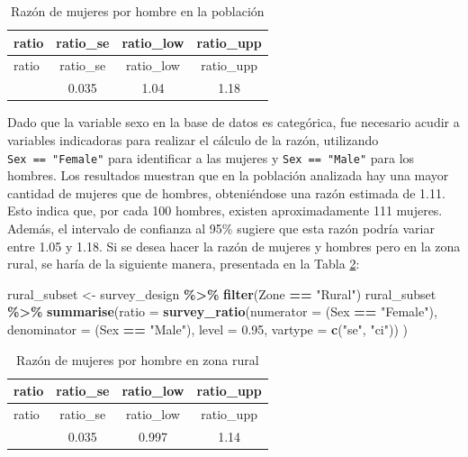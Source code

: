 \documentclass[
  spanish,
  12pt,
]{book}
\newenvironment{Shaded}{\begin{snugshade}}{\end{snugshade}}
\newcommand{\AttributeTok}[1]{\textcolor[rgb]{0.13,0.29,0.53}{#1}}
\newcommand{\FloatTok}[1]{\textcolor[rgb]{0.00,0.00,0.81}{#1}}
\newcommand{\FunctionTok}[1]{\textcolor[rgb]{0.13,0.29,0.53}{\textbf{#1}}}
\newcommand{\NormalTok}[1]{#1}
\newcommand{\OtherTok}[1]{\textcolor[rgb]{0.56,0.35,0.01}{#1}}
\newcommand{\SpecialCharTok}[1]{\textcolor[rgb]{0.81,0.36,0.00}{\textbf{#1}}}
\newcommand{\StringTok}[1]{\textcolor[rgb]{0.31,0.60,0.02}{#1}}
\begin{document}
\begin{longtable}[]{@{}lccc@{}}
\caption{\label{tab:tab-razon-sexo}Razón de mujeres por hombre en la población}\tabularnewline
\toprule\noalign{}
ratio & ratio\_se & ratio\_low & ratio\_upp \\
\midrule\noalign{}
\endfirsthead
\toprule\noalign{}
ratio & ratio\_se & ratio\_low & ratio\_upp \\
\midrule\noalign{}
\endhead
\bottomrule\noalign{}
\endlastfoot
1.11 & 0.035 & 1.04 & 1.18 \\
\end{longtable}

Dado que la variable sexo en la base de datos es categórica, fue necesario acudir a variables indicadoras para realizar el cálculo de la razón, utilizando \texttt{Sex\ ==\ "Female"} para identificar a las mujeres y \texttt{Sex\ ==\ "Male"} para los hombres. Los resultados muestran que en la población analizada hay una mayor cantidad de mujeres que de hombres, obteniéndose una razón estimada de 1.11. Esto indica que, por cada 100 hombres, existen aproximadamente 111 mujeres. Además, el intervalo de confianza al 95\% sugiere que esta razón podría variar entre 1.05 y 1.18. Si se desea hacer la razón de mujeres y hombres pero en la zona rural, se haría de la siguiente manera, presentada en la Tabla \ref{tab:tab-razon-sexo-rural}:

\begin{Shaded}
\begin{Highlighting}[]
\NormalTok{rural\_subset }\OtherTok{\textless{}{-}}\NormalTok{ survey\_design }\SpecialCharTok{\%\textgreater{}\%}
  \FunctionTok{filter}\NormalTok{(Zone }\SpecialCharTok{==} \StringTok{"Rural"}\NormalTok{)}
\NormalTok{rural\_subset }\SpecialCharTok{\%\textgreater{}\%}
  \FunctionTok{summarise}\NormalTok{(}\AttributeTok{ratio =} \FunctionTok{survey\_ratio}\NormalTok{(}\AttributeTok{numerator =}\NormalTok{ (Sex }\SpecialCharTok{==} \StringTok{"Female"}\NormalTok{),}
                                  \AttributeTok{denominator =}\NormalTok{ (Sex }\SpecialCharTok{==} \StringTok{"Male"}\NormalTok{),}
                                  \AttributeTok{level =} \FloatTok{0.95}\NormalTok{,}
                                  \AttributeTok{vartype =} \FunctionTok{c}\NormalTok{(}\StringTok{"se"}\NormalTok{, }\StringTok{"ci"}\NormalTok{))}
\NormalTok{            )}
\end{Highlighting}
\end{Shaded}

\begin{longtable}[]{@{}lccc@{}}
\caption{\label{tab:tab-razon-sexo-rural}Razón de mujeres por hombre en zona rural}\tabularnewline
\toprule\noalign{}
ratio & ratio\_se & ratio\_low & ratio\_upp \\
\midrule\noalign{}
\endfirsthead
\toprule\noalign{}
ratio & ratio\_se & ratio\_low & ratio\_upp \\
\midrule\noalign{}
\endhead
\bottomrule\noalign{}
\endlastfoot
1.07 & 0.035 & 0.997 & 1.14 \\
\end{longtable}
\end{document}
